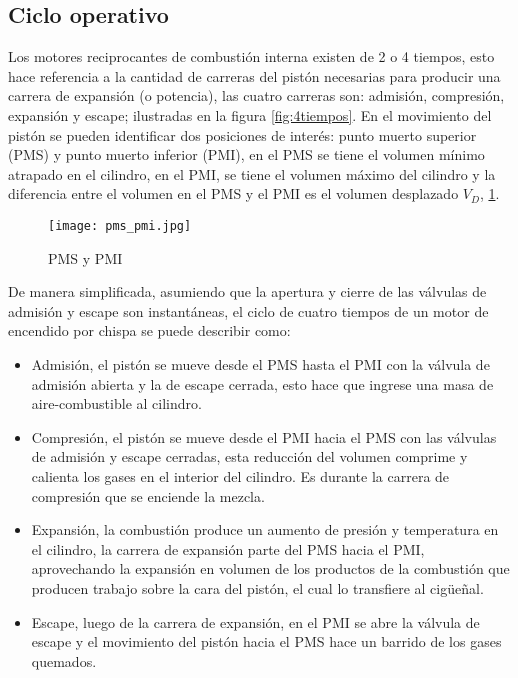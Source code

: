 \subsection{Ciclo operativo}
%
Los motores reciprocantes de combustión interna existen de 2 o 4 tiempos, esto
hace referencia a la cantidad de carreras del pistón necesarias para producir
una carrera de expansión (o potencia), las cuatro carreras son: admisión,
compresión, expansión y escape; ilustradas en la figura \ref{fig:4tiempos}.
%
En el movimiento del pistón se pueden identificar dos posiciones de interés:
punto muerto superior (PMS) y punto muerto inferior (PMI), en el PMS se tiene
el volumen mínimo atrapado en el cilindro, en el PMI, se tiene el volumen
máximo del cilindro y la diferencia entre el volumen en el PMS y el PMI es el
volumen desplazado $V_D$, \ref{fig:pms_pmi}.

\begin{figure}
    \centering
    \texttt{[image: pms\_pmi.jpg]}
    \caption{PMS y PMI}\label{fig:pms_pmi}
\end{figure}

De manera simplificada, asumiendo que la apertura y cierre de las válvulas de
admisión y escape son instantáneas, el ciclo de cuatro tiempos de un motor de
encendido por chispa se puede describir como:
%
\begin{itemize}
%
    \item Admisión, el pistón se mueve desde el PMS hasta el PMI con la válvula
        de admisión abierta y la de escape cerrada, esto hace que ingrese una
        masa de aire-combustible al cilindro.
%
    \item Compresión, el pistón se mueve desde el PMI hacia el PMS con las
        válvulas de admisión y escape cerradas, esta reducción del volumen
        comprime y calienta los gases en el interior del cilindro.
        Es durante la carrera de compresión que se enciende la mezcla.
%
    \item Expansión, la combustión produce un aumento de presión y temperatura
        en el cilindro, la carrera de expansión parte del PMS hacia el PMI,
        aprovechando la expansión en volumen de los productos de la combustión
        que producen trabajo sobre la cara del pistón, el cual lo transfiere al
        cigüeñal.
%
    \item Escape, luego de la carrera de expansión, en el PMI se abre la
        válvula de escape y el movimiento del pistón hacia el PMS hace un
        barrido de los gases quemados.
%
\end{itemize}

